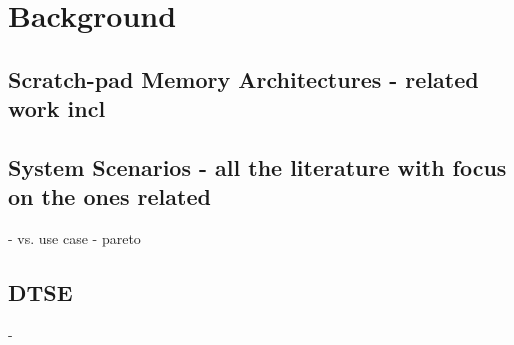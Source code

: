 \chapter{Background} %
\label{background}

\section{Scratch-pad Memory Architectures - related work incl}

\section{System Scenarios - all the literature with focus on the ones related}
	- vs. use case
	- pareto

\section{DTSE}
	-

